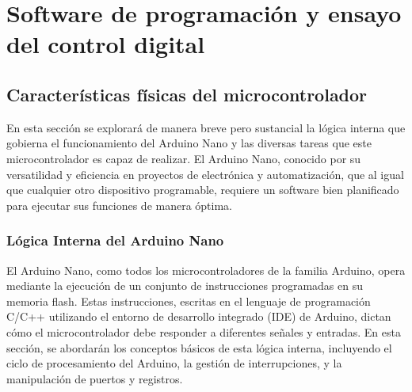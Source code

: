 \chapter{Software de programación y ensayo del control digital}

\label{C:Software de programación y ensayo del control digital}

\section{Características físicas del microcontrolador}
En esta sección se explorará de manera breve pero sustancial la lógica interna que gobierna el funcionamiento del Arduino Nano y las diversas tareas que este microcontrolador es capaz de realizar. El Arduino Nano, conocido por su versatilidad y eficiencia en proyectos de electrónica y automatización, que al igual que cualquier otro dispositivo programable, requiere un software bien planificado para ejecutar sus funciones de manera óptima.

\subsection{Lógica Interna del Arduino Nano}
El Arduino Nano, como todos los microcontroladores de la familia Arduino, opera mediante la ejecución de un conjunto de instrucciones programadas en su memoria flash. Estas instrucciones, escritas en el lenguaje de programación C/C++ utilizando el entorno de desarrollo integrado (IDE) de Arduino, dictan cómo el microcontrolador debe responder a diferentes señales y entradas. En esta sección, se abordarán los conceptos básicos de esta lógica interna, incluyendo el ciclo de procesamiento del Arduino, la gestión de interrupciones, y la manipulación de puertos y registros.

